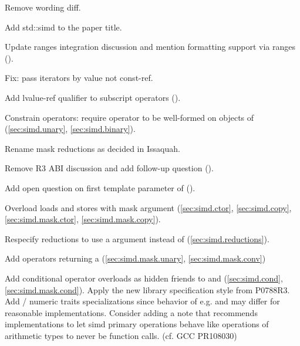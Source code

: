 \begin{revision}
\item Remove wording diff.
\item Add std::simd to the paper title.
\item Update ranges integration discussion and mention formatting support via
  ranges ().
\item Fix: pass iterators by value not const-ref.
\item Add lvalue-ref qualifier to subscript operators ().
\item Constrain  operators: require operator to be well-formed on objects of  (\ref{sec:simd.unary}, \ref{sec:simd.binary}).
\item Rename mask reductions as decided in Issaquah.
\item Remove R3 ABI discussion and add follow-up question ().
\item Add open question on first template parameter of  ().
\item Overload loads and stores with mask argument (\ref{sec:simd.ctor}, \ref{sec:simd.copy}, \ref{sec:simd.mask.ctor}, \ref{sec:simd.mask.copy}).
\item Respecify \simd reductions to use a \mask argument instead of  (\ref{sec:simd.reductions}).
\item Add \mask operators returning a \simd (\ref{sec:simd.mask.unary}, \ref{sec:simd.mask.conv})
\item Add conditional operator overloads as hidden friends to \simd and \mask
  (\ref{sec:simd.cond}, \ref{sec:simd.mask.cond}).
  \todo Apply the new library specification style from P0788R3.
  \todo Add  / numeric traits specializations since behavior of e.g.  and  may differ for reasonable implementations.
  \todo Consider adding a note that recommends implementations to let simd primary operations behave like operations of arithmetic types to never be function calls. (cf. GCC PR108030)
\end{revision}
